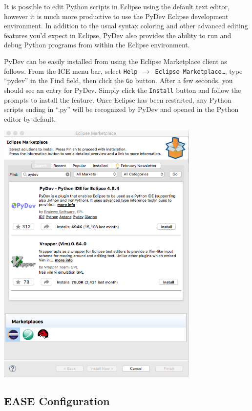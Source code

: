 It is possible to edit Python scripts in Eclipse using the default text editor,
however it is much more productive to use the PyDev Eclipse development
environment. In addition to the usual syntax coloring and other advanced editing
features you'd expect in Eclipse, PyDev also provides the ability to run and
debug Python programs from within the Eclipse environment.

PyDev can be easily installed from using the Eclipse Marketplace client as
follows. From the ICE menu bar, select \texttt{Help $\rightarrow$ Eclipse
Marketplace\ldots}, type ``pydev'' in the Find field, then click the \texttt{Go}
button.
After a few seconds, you should see an entry for PyDev. Simply click the
\texttt{Install} button and follow the prompts to install the feature. Once
Eclipse has been restarted, any Python scripts ending in ``.py'' will be recognized by
PyDev and opened in the Python editor by default.

\begin{center}
\includegraphics[width=10cm]{images/pydev-marketplace}
\end{center}

\subsection{EASE Configuration}

